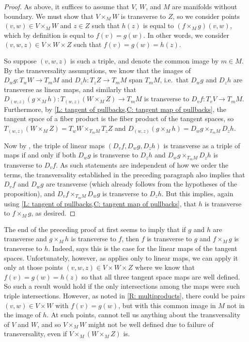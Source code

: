 \begin{proof}
	As above, it suffices to assume that $V$, $W$, and $M$ are manifolds without boundary. We must show that $V \times_MW$ is transverse to $Z$, so we consider points $(v,w) \in V \times_M W$ and $z \in Z$ such that $h(z)$ is equal to $(f \times_Mg)(v,w)$, which by definition is equal to $f(v) = g(w)$. In other words, we consider $(v,w,z) \in V \times W \times Z$ such that $f(v) = g(w) = h(z)$.

	So suppose $(v,w,z)$ is such a triple, and denote the common image by $m \in M$. By the transversality assumptions, we know that the images of $D_wg \colon T_wW \to T_mM$ and $D_z h \colon T_zZ \to T_mM$ span $T_mM$, i.e.\ that $D_wg$ and $D_zh$ are transverse as linear maps, and similarly that $D_{(w,z)}(g \times_M h) \colon T_{(w,z)}(W \times_M Z) \to T_mM$ is transverse to $D_vf \colon T_vV \to T_mM$. Furthermore, by \cref{L: tangent of pullbacks,C: tangent map of pullbacks}, the tangent space of a fiber product is the fiber product of the tangent spaces, so $T_{(w,z)}(W \times_M Z) = T_wW \times_{T_mM}T_zZ$ and $D_{(w,z)}(g \times_M h) = D_wg \times_{T_mM}D_zh$.

	Now by \cite[Propositions~4-9]{RamBas09}, the triple of linear maps $(D_vf,D_wg,D_zh)$ is transverse as a triple of maps if and only if both $D_wg$ is transverse to $D_zh$ and $D_wg \times_{T_mM}D_zh$ is transverse to $D_vf$. As such statements are independent of how we order the terms, the transversality established in the preceding paragraph also implies that $D_vf$ and $D_wg$ are transverse (which already follows from the hypotheses of the proposition), and $D_vf \times_{T_mM}D_wg$ is transverse to $D_zh$. But this implies, again using \cref{L: tangent of pullbacks,C: tangent map of pullbacks}, that $h$ is transverse to $f \times_Mg$, as desired.
\end{proof}

\begin{remark}
	The end of the preceding proof at first seems to imply that if $g$ and $h$ are transverse and $g \times_M h$ is transverse to $f$, then $f$ is transverse to $g$ and $f \times_Mg$ is transverse to $h$. Indeed, \cite[Propositions~4-9]{RamBas09} says this is the case for the linear maps of the tangent spaces. Unfortunately, however, as \cite[Propositions~4-9]{RamBas09} applies only to linear maps, we can apply it only at those points $(v,w,z) \in V \times W \times Z$ where we know that $f(v) = g(w) = h(z)$ so that all three tangent space maps are well defined. So such a result would hold if the only intersections among the maps were such triple intersections. However, as noted in \cref{R: multiproducts}, there could be pairs $(v,w) \in V \times W$ with $f(v) = g(w)$, but with this common image in $M$ not in the image of $h$. At such points, \cite[Propositions~4-9]{RamBas09} cannot tell us anything about the transversality of $V$ and $W$, and so $V \times_MW$ might not be well defined due to failure of transversality, even if $V \times_M (W \times_M Z)$ is.
\end{remark}